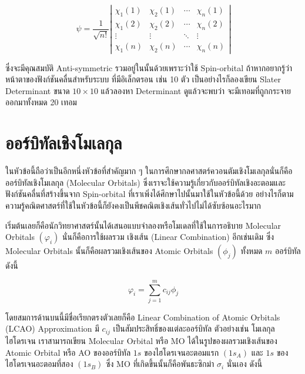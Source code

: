 \begin{equation}
    \label{eq:Slater_determinant}
    \psi =
    \frac{1}{\sqrt{n !}}
    \left|
    \begin{array}{cccc}
        \chi_1(1) & \chi_2(1) & \cdots & \chi_n(1) \\
        \chi_1(2) & \chi_2(2) & \cdots & \chi_n(2) \\
        \vdots    & \vdots    & \ddots & \vdots    \\
        \chi_1(n) & \chi_2(n) & \cdots & \chi_n(n)
    \end{array}
    \right|
\end{equation}

\noindent ซึ่งจะมีคุณสมบัติ Anti-symmetric รวมอยู่ในนั้นด้วยเพราะว่าใช้ Spin-orbital ถ้าหากอยากรู้ว่าหน้าตาของฟังก์ชันคลื่นสำหรับระบบ%
ที่มีอิเล็กตรอน เช่น 10 ตัว เป็นอย่างไรก็ลองเขียน Slater Determinant ขนาด $10 \times 10$ แล้วลองหา Determinant ดูแล้วจะพบว่า%
จะมีเทอมที่ถูกกระจายออกมาทั้งหมด 20 เทอม

\section{ออร์บิทัลเชิงโมเลกุล}

ในหัวข้อนี้ถือว่าเป็นอีกหนึ่งหัวข้อที่สำคัญมาก ๆ ในการศึกษากลศาสตร์ควอนตัมเชิงโมเลกุลนั่นก็คือออร์บิทัลเชิงโมเลกุล (Molecular Orbitals)
ซึ่งเราจะใช้ความรู้เกี่ยวกับออร์บิทัลเชิงอะตอมและฟังก์ชันคลื่นที่สร้างขึ้นจาก Spin-orbital ที่เราเพิ่งได้ศึกษาไปนั้นมาใช้ในหัวข้อนี้ด้วย
อย่างไรก็ตาม ความรู้คณิตศาสตร์ที่ใช้ในหัวข้อนี้ก็ยังคงเป็นพีชคณิตเชิงเส้นทั่วไปไม่ได้ซับซ้อนอะไรมาก

เริ่มต้นเลยก็คือนักวิทยาศาสตร์นั้นได้เสนอแบบจำลองหรือโมเดลที่ใช้ในการอธิบาย Molecular Orbitals $(\varphi_i)$ นั่นก็คือการใช้ผลรวม%
เชิงเส้น (Linear Combination) อีกเช่นเดิม ซึ่ง Molecular Orbitals นั้นก็คือผลรวมเชิงเส้นของ Atomic Orbitals $(\phi_j)$ ทั้งหมด
$m$ ออร์บิทัล ดังนี้

\begin{equation}
    \label{eq:LCAO}
    \varphi_i = \sum_{j=1}^m c_{i j} \phi_j
\end{equation}

\noindent โดยสมการด้านบนนี้มีชื่อเรียกตรงตัวเลยก็คือ Linear Combination of Atomic Orbitals (LCAO) Approximation
มี $c_{i j}$ เป็นสัมประสิทธิ์ของแต่ละออร์บิทัล ตัวอย่างเช่น โมเลกุลไฮโดรเจน  เราสามารถเขียน Molecular Orbital หรือ MO
ได้ในรูปของผลรวมเชิงเส้นของ Atomic Orbital หรือ AO ของออร์บิทัล $1 s$ ของไฮโดรเจนอะตอมแรก $(1 s_A)$ และ $1 s$
ของไฮโดรเจนอะตอมที่สอง $(1 s_B)$ ซึ่ง MO ที่เกิดขึ้นนั้นก็คือพันธะซิกม่า $\sigma_i$ นั่นเอง ดังนี้

